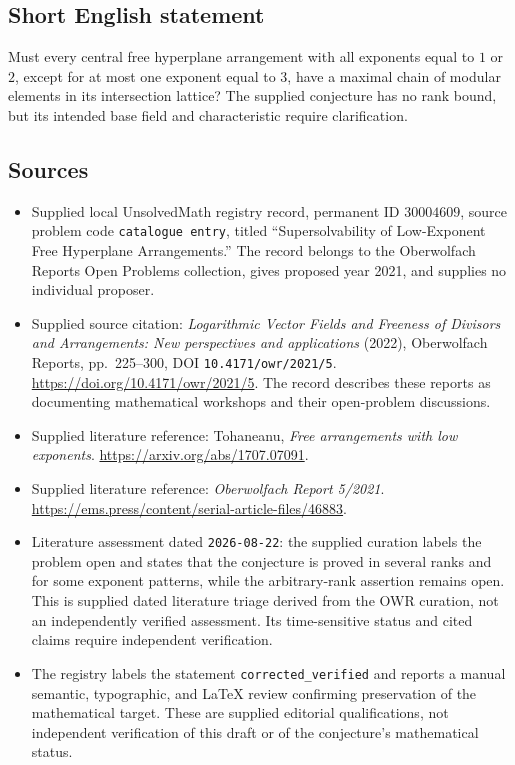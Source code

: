 \documentclass[11pt]{article}
\begin{document}
\subsection{Short English statement}
Must every central free hyperplane arrangement with all exponents equal to \(1\) or \(2\), except for at most one exponent equal to \(3\), have a maximal chain of modular elements in its intersection lattice? The supplied conjecture has no rank bound, but its intended base field and characteristic require clarification.
\subsection{Sources}
\begin{itemize}
\item Supplied local UnsolvedMath registry record, permanent ID \(30004609\), source problem code \texttt{catalogue entry}, titled ``Supersolvability of Low-Exponent Free Hyperplane Arrangements.'' The record belongs to the Oberwolfach Reports Open Problems collection, gives proposed year 2021, and supplies no individual proposer.
\item Supplied source citation: \emph{Logarithmic Vector Fields and Freeness of Divisors and Arrangements: New perspectives and applications} (2022), Oberwolfach Reports, pp.\ 225--300, DOI \texttt{10.4171/owr/2021/5}. \url{https://doi.org/10.4171/owr/2021/5}. The record describes these reports as documenting mathematical workshops and their open-problem discussions.
\item Supplied literature reference: Tohaneanu, \emph{Free arrangements with low exponents}. \url{https://arxiv.org/abs/1707.07091}.
\item Supplied literature reference: \emph{Oberwolfach Report 5/2021}. \url{https://ems.press/content/serial-article-files/46883}.
\item Literature assessment dated \texttt{2026-08-22}: the supplied curation labels the problem open and states that the conjecture is proved in several ranks and for some exponent patterns, while the arbitrary-rank assertion remains open. This is supplied dated literature triage derived from the OWR curation, not an independently verified assessment. Its time-sensitive status and cited claims require independent verification.
\item The registry labels the statement \texttt{corrected\_verified} and reports a manual semantic, typographic, and LaTeX review confirming preservation of the mathematical target. These are supplied editorial qualifications, not independent verification of this draft or of the conjecture's mathematical status.
\end{itemize}
\end{document}
